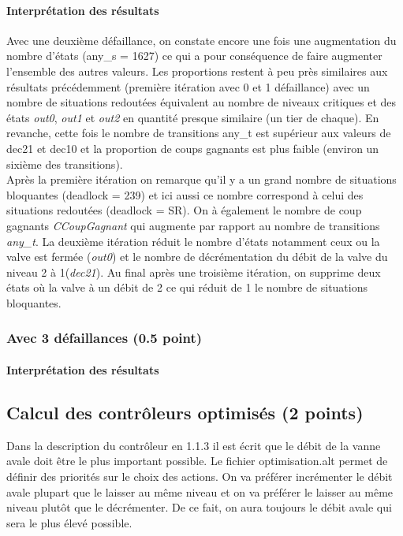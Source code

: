 \documentclass[a4paper]{book}
\begin{document}
\paragraph{Interprétation des résultats}
Avec une deuxième défaillance, on constate encore une fois une augmentation du nombre d'états (any\_s = 1627) ce qui a pour conséquence de faire augmenter l'ensemble 
des autres valeurs. Les proportions restent à peu près similaires aux résultats précédemment (première itération avec 0 et 1 défaillance) avec un nombre de situations 
redoutées équivalent au nombre de niveaux critiques et des états  \textit{out0},  \textit{out1} et  \textit{out2} en quantité presque similaire (un tier de chaque). En revanche, 
cette fois le nombre de transitions any\_t est supérieur aux valeurs de dec21 et dec10 et la proportion de coups gagnants est plus faible (environ un sixième des 
transitions). \\
Après la première itération on remarque qu'il y a un grand nombre de situations bloquantes (deadlock = 239) et ici aussi ce nombre correspond à celui des 
situations redoutées (deadlock = SR). On à également le nombre de coup gagnants \textit{CCoupGagnant} qui augmente par rapport au nombre de transitions \textit{any\_t}. 
La deuxième itération réduit le nombre d'états notamment ceux ou la valve est fermée (\textit{out0}) et le nombre de décrémentation du débit de la valve du niveau 2 à 
1(\textit{dec21}). 
Au final après une troisième itération, on supprime deux états où la valve à un débit de 2 ce qui réduit de 1 le nombre de situations bloquantes.

\subsubsection{Avec 3 défaillances (0.5 point)}




%
\paragraph{Interprétation des résultats}

\subsection{Calcul des contrôleurs optimisés (2 points)}

Dans la description du contrôleur en 1.1.3 il est écrit que le débit de la vanne avale doit être le plus important possible.
Le fichier optimisation.alt permet de définir des priorités sur le choix des actions. On va préférer incrémenter le débit avale 
plupart que le laisser au même niveau et on va préférer le laisser au même niveau plutôt que le décrémenter. De ce fait, on aura 
toujours le débit avale qui sera le plus élevé possible.
\end{document}
